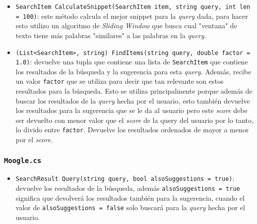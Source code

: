 \documentclass[a4paper, 12pt]{report}
\begin{document}
\begin{itemize}
	\item {\tt SearchItem CalculateSnippet(SearchItem item, string query, int len = 100)}: este método calcula el mejor snippet para la {\it query} dada, para hacer esto utilizo un algoritmo de {\it Sliding Window} que busca cual "ventana" de texto tiene más palabras "similares" a las palabras en la {\it query}.
	\item {\tt (List<SearchItem>, string) FindItems(string query, double factor = 1.0)}: devuelve una tupla que contiene una lista de {\tt SearchItem} que contiene los resultados de la búsqueda y la sugerencia para esta {\it query}. Además, recibe un valor {\tt factor} que se utiliza para decir que tan relevante son estos resultados para la búsqueda. Esto se utiliza principalmente porque además de buscar los resultados de la {\it query} hecha por el usuario, esto también devuelve los resultados para la sugerencia que se le da al usuario pero este {\it score} debe ser devuelto con menor valor que el {\it score} de la query del usuario por lo tanto, lo divido entre {\tt factor}. Devuelve los resultados ordenados de mayor a menor por el {\it score}.
\end{itemize}

\subsubsection*{\tt Moogle.cs}

\begin{itemize}
	\item {\tt SearchResult Query(string query, bool alsoSuggestions = true)}: devuelve los resultados de la búsqueda, además {\tt alsoSuggestions = true} significa que devolverá los resultados también para la sugerencia, cuando el valor de {\tt alsoSuggestions = false} solo buscará para la {\it query} hecha por el usuario.
\end{itemize}
\end{document}
